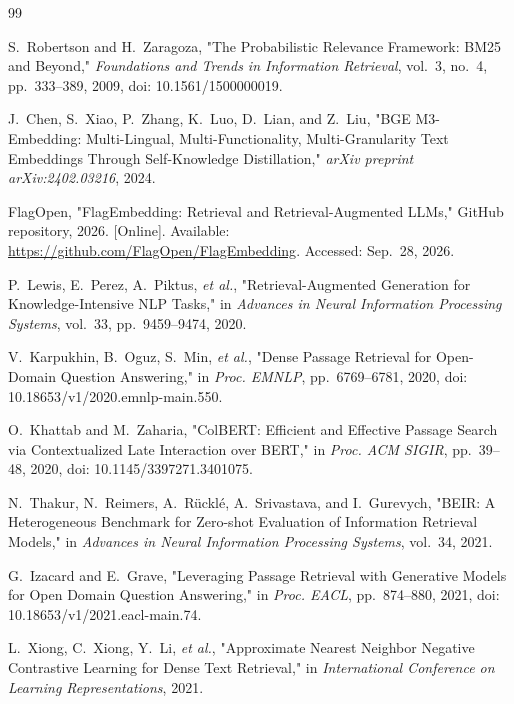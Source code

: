 \begin{thebibliography}{99}


S.~Robertson and H.~Zaragoza,
"The Probabilistic Relevance Framework: BM25 and Beyond,"
\emph{Foundations and Trends in Information Retrieval},
vol.~3, no.~4, pp.~333--389, 2009,
doi: 10.1561/1500000019.

J.~Chen, S.~Xiao, P.~Zhang, K.~Luo, D.~Lian, and Z.~Liu,
"BGE M3-Embedding: Multi-Lingual, Multi-Functionality, Multi-Granularity Text Embeddings Through Self-Knowledge Distillation,"
\emph{arXiv preprint arXiv:2402.03216}, 2024.

FlagOpen,
"FlagEmbedding: Retrieval and Retrieval-Augmented LLMs,"
GitHub repository, 2026. [Online]. Available:
\url{https://github.com/FlagOpen/FlagEmbedding}. Accessed: Sep.~28, 2026.

P.~Lewis, E.~Perez, A.~Piktus, \emph{et al.},
"Retrieval-Augmented Generation for Knowledge-Intensive NLP Tasks,"
in \emph{Advances in Neural Information Processing Systems}, vol.~33, pp.~9459--9474, 2020.

V.~Karpukhin, B.~Oguz, S.~Min, \emph{et al.},
"Dense Passage Retrieval for Open-Domain Question Answering,"
in \emph{Proc. EMNLP}, pp.~6769--6781, 2020,
doi: 10.18653/v1/2020.emnlp-main.550.

O.~Khattab and M.~Zaharia,
"ColBERT: Efficient and Effective Passage Search via Contextualized Late Interaction over BERT,"
in \emph{Proc. ACM SIGIR}, pp.~39--48, 2020,
doi: 10.1145/3397271.3401075.

N.~Thakur, N.~Reimers, A.~R\"uckl\'e, A.~Srivastava, and I.~Gurevych,
"BEIR: A Heterogeneous Benchmark for Zero-shot Evaluation of Information Retrieval Models,"
in \emph{Advances in Neural Information Processing Systems}, vol.~34, 2021.

G.~Izacard and E.~Grave,
"Leveraging Passage Retrieval with Generative Models for Open Domain Question Answering,"
in \emph{Proc. EACL}, pp.~874--880, 2021,
doi: 10.18653/v1/2021.eacl-main.74.

L.~Xiong, C.~Xiong, Y.~Li, \emph{et al.},
"Approximate Nearest Neighbor Negative Contrastive Learning for Dense Text Retrieval,"
in \emph{International Conference on Learning Representations}, 2021.


\end{thebibliography}
